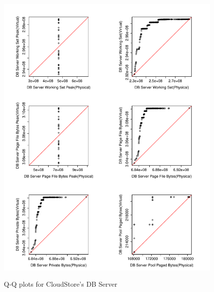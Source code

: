 \begin{figure}[tbh]
	\centering
	{\includegraphics[width=1.0\textwidth]{figures/appendix/qq_plots/CloudStore/DB_Server/Second_six.pdf}}
	\caption{Q-Q plots for CloudStore's DB Server}
\end{figure}

